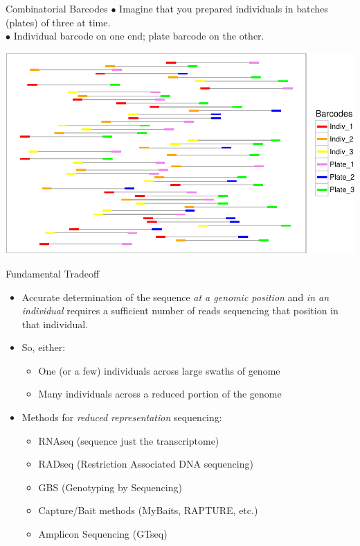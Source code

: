 \documentclass[letter,graphicx]{beamer}
\begin{document}
\begin{frame}{Combinatorial Barcodes}
$\bullet$ Imagine that you prepared individuals in batches (plates) of three at time.\\
$\bullet$ Individual barcode on one end; plate barcode on the other.
\begin{center}
\includegraphics[width=.95\textwidth]{mhap_figs/combi-barcodes-crop.pdf}
\end{center}
\end{frame}






\begin{frame}{Fundamental Tradeoff}
\begin{itemize}
\item Accurate determination of the sequence {\em at a genomic position} and {\em in an individual} requires a sufficient number of reads sequencing that position in that individual.
\item So, either:
\begin{itemize}
\item One (or a few) individuals across large swaths of genome
\item Many individuals across a reduced portion of the genome
\end{itemize}
\item Methods for {\em reduced representation} sequencing:
\begin{itemize}
\item RNAseq (sequence just the transcriptome)
\item RADseq (Restriction Associated DNA sequencing)
\item GBS (Genotyping by Sequencing)
\item Capture/Bait methods (MyBaits, RAPTURE, etc.)
\item Amplicon Sequencing (GTseq)
\end{itemize}
\end{itemize}
\end{frame}
\end{document}
